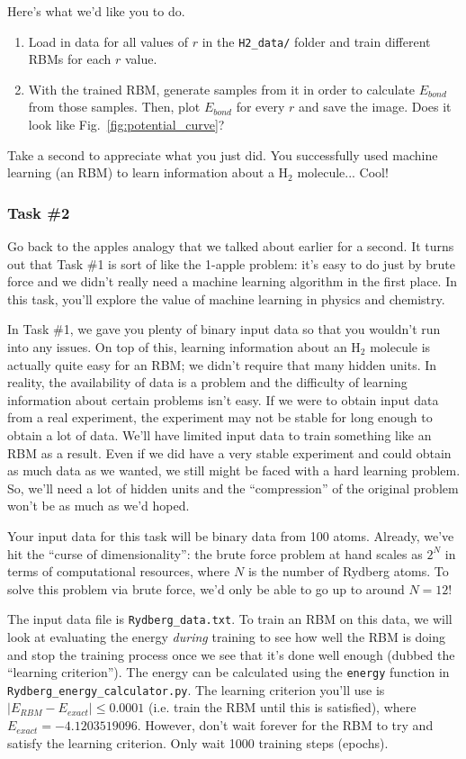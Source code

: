 \documentclass[12pt]{article}
\begin{document}
Here's what we'd like you to do.
\begin{enumerate}
    \item Load in data for all values of $r$ in the \texttt{H2\_data/} folder and train different RBMs for each $r$ value.
    \item With the trained RBM, generate samples from it in order to calculate $E_{bond}$ from those samples. Then, plot $E_{bond}$ for every $r$ and save the image. Does it look like Fig.~\ref{fig:potential_curve}?
\end{enumerate}
Take a second to appreciate what you just did. You successfully used machine learning (an RBM) to learn information about a H$_2$ molecule... Cool! 

\subsubsection*{Task \#2}

Go back to the apples analogy that we talked about earlier for a second. It turns out that Task \#1 is sort of like the 1-apple problem: it's easy to do just by brute force and we didn't really need a machine learning algorithm in the first place.  In this task, you'll explore the value of machine learning in physics and chemistry. 

In Task \#1, we gave you plenty of binary input data so that you wouldn't run into any issues. On top of this, learning information about an H$_2$ molecule is actually quite easy for an RBM; we didn't require that many hidden units. In reality, the availability of data is a problem and the difficulty of learning information about certain problems isn't easy. If we were to obtain input data from a real experiment, the experiment may not be stable for long enough to obtain a lot of data. We'll have limited input data to train something like an RBM as a result. Even if we did have a very stable experiment and could obtain as much data as we wanted, we still might be faced with a hard learning problem. So, we'll need a lot of hidden units and the ``compression'' of the original problem won't be as much as we'd hoped.

Your input data for this task will be binary data from 100 atoms. Already, we've hit the ``curse of dimensionality'': the brute force problem at hand scales as $2^N$ in terms of computational resources, where $N$ is the number of Rydberg atoms. To solve this problem via brute force, we'd only be able to go up to around $N = 12$! 

The input data file is \texttt{Rydberg\_data.txt}. To train an RBM on this data, we will look at evaluating the energy \textit{during} training to see how well the RBM is doing and stop the training process once we see that it's done well enough (dubbed the ``learning criterion''). The energy can be calculated using the \texttt{energy} function in \texttt{Rydberg\_energy\_calculator.py}. The learning criterion you'll use is $\vert E_{RBM} - E_{exact} \vert \leq 0.0001$ (i.e. train the RBM until this is satisfied), where $E_{exact} = -4.1203519096$. However, don't wait forever for the RBM to try and satisfy the learning criterion. Only wait 1000 training steps (epochs).
\end{document}
